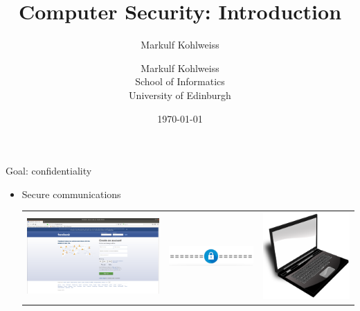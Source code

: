 \documentclass[aspectratio=169, lualatex, handout, 10pt,dvipsnames,svgnames]{beamer} %
\title{Computer Security: Introduction}
\author{Markulf Kohlweiss}
\institute{University of Edinburgh, School of Informatics}
\date{\today}
\author{Markulf Kohlweiss \\
  School of Informatics \\
  University of Edinburgh}
\date{}
\begin{document}
\begin{frame}
  \titlepage

\end{frame}

\begin{frame}{Goal: confidentiality}\bigskip
\vspace{-0.5cm}
  \begin{itemize}
  \item Secure communications
    \medskip
    \begin{center}
      \begin{tabular}{m{4.45cm}m{2cm}m{2cm}}
        \includegraphics[scale=0.075]{Images/facebook.pdf} & \includegraphics[scale=0.25]{Images/encrypted-channel.pdf} & \includegraphics[scale=0.2]{Images/laptop.pdf}
      \end{tabular}
    \end{center}
    \bigskip


\end{itemize}
\end{frame}
\end{document}
